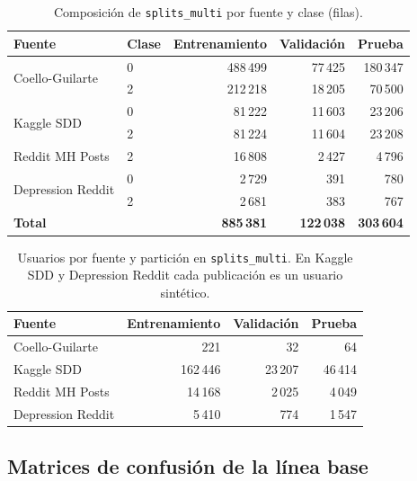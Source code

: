 \documentclass[12pt,a4paper]{article}
\begin{document}
\begin{table}[H]
\centering
\small
\caption{Composición de \texttt{splits\_multi} por fuente y clase (filas).}
\label{tab:manifiesto_multi}
\begin{tabular}{llrrr}
\toprule
\textbf{Fuente} & \textbf{Clase} & \textbf{Entrenamiento} & \textbf{Validación} & \textbf{Prueba} \\
\midrule
\multirow{2}{*}{Coello-Guilarte}   & 0 & 488\,499 & 77\,425 & 180\,347 \\
                                   & 2 & 212\,218 & 18\,205 &  70\,500 \\
\multirow{2}{*}{Kaggle SDD}        & 0 &  81\,222 & 11\,603 &  23\,206 \\
                                   & 2 &  81\,224 & 11\,604 &  23\,208 \\
Reddit MH Posts                    & 2 &  16\,808 &  2\,427 &   4\,796 \\
\multirow{2}{*}{Depression Reddit} & 0 &   2\,729 &     391 &      780 \\
                                   & 2 &   2\,681 &     383 &      767 \\
\midrule
\multicolumn{2}{l}{\textbf{Total}} & \textbf{885\,381} & \textbf{122\,038} & \textbf{303\,604} \\
\bottomrule
\end{tabular}
\end{table}

\begin{table}[H]
\centering
\small
\caption{Usuarios por fuente y partición en \texttt{splits\_multi}. En Kaggle SDD y Depression Reddit cada publicación es un usuario sintético.}
\label{tab:usuarios_multi}
\begin{tabular}{lrrr}
\toprule
\textbf{Fuente} & \textbf{Entrenamiento} & \textbf{Validación} & \textbf{Prueba} \\
\midrule
Coello-Guilarte   &      221 &     32 &      64 \\
Kaggle SDD        & 162\,446 & 23\,207 & 46\,414 \\
Reddit MH Posts   &  14\,168 &  2\,025 &  4\,049 \\
Depression Reddit &   5\,410 &    774 &  1\,547 \\
\bottomrule
\end{tabular}
\end{table}

\subsection{Matrices de confusión de la línea base}
\end{document}
